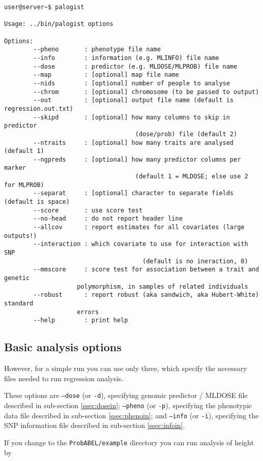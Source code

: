 \documentclass[12pt,a4paper]{article}
\begin{document}
\begin{verbatim}
user@server~$ palogist

Usage: ../bin/palogist options

Options:
		--pheno       : phenotype file name
		--info        : information (e.g. MLINFO) file name
		--dose        : predictor (e.g. MLDOSE/MLPROB) file name
		--map         : [optional] map file name
		--nids        : [optional] number of people to analyse
		--chrom       : [optional] chromosome (to be passed to output)
		--out         : [optional] output file name (default is regression.out.txt)
		--skipd       : [optional] how many columns to skip in predictor
								    (dose/prob) file (default 2)
		--ntraits     : [optional] how many traits are analysed (default 1)
		--ngpreds     : [optional] how many predictor columns per marker
								    (default 1 = MLDOSE; else use 2 for MLPROB)
		--separat     : [optional] character to separate fields (default is space)
		--score       : use score test
		--no-head     : do not report header line
		--allcov      : report estimates for all covariates (large outputs!)
		--interaction : which covariate to use for interaction with SNP
									  (default is no ineraction, 0)
		--mmscore     : score test for association between a trait and genetic
                    polymorphism, in samples of related individuals	
		--robust      : report robust (aka sandwich, aka Hubert-White) standard 
                    errors
		--help        : print help

\end{verbatim}


\subsection{Basic analysis options}
However, for 
a simple run you can use only three, which specify the necessary files 
needed to run regression analysis.

These options are 
\texttt{--dose} (or \texttt{-d}), 
specifying genomic predictor / MLDOSE file described in sub-section \ref{ssec:dosein};
\texttt{--pheno} (or \texttt{-p}), 
specifying the phenotypic data file described in sub-section \ref{ssec:phenoin}; and
\texttt{--info} (or \texttt{-i}), 
specifying the SNP information file described in sub-section \ref{ssec:infoin}.

If you change to the \texttt{ProbABEL/example} directory you can run analysis of 
height by 
\end{document}
